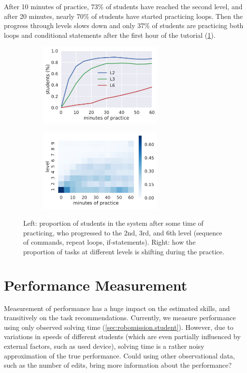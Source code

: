 After 10 minutes of practice, 73\% of students have reached the second level,
and after 20 minutes, nearly 70\% of students have started practicing loops.
Then the progress through levels slows down and only 37\% of students
are practicing both loops and conditional statements after the first
hour of the tutorial (\cref{fig:students-at-levels}).

\begin{figure}[htb]
\centering
\begin{subfigure}{.49\textwidth}
\centering
\includegraphics[height=42mm]{img/students-at-levels}
\end{subfigure}
\begin{subfigure}{.49\textwidth}
\centering
\includegraphics[height=42mm]{img/task-sessions-at-levels}
\end{subfigure}
\caption{%
  Left: proportion of students in the system after some time of practicing,
  who progressed to the 2nd, 3rd, and 6th level (sequence of commands, repeat loops, if-statements).
  Right: how the proportion of tasks at different levels is shifting during the practice.}
\label{fig:students-at-levels}
\end{figure}

\section{Performance Measurement}

Measurement of performance has a huge impact on the estimated skills, %
and transitively on %
the task recommendations. %
Currently, we measure %
performance using only observed solving time
(\cref{sec:robomission.student}).
However, due to variations in speeds of different students
(which are even partially influenced by external factors, such as used device),
solving time is a rather noisy approximation of the true performance.
Could using other observational data, such as the number of edits,
bring more information about the performance?

